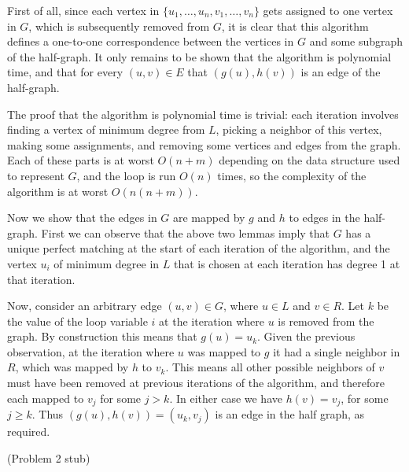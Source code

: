 \documentclass{hmcpset}
\begin{document}
\begin{solution}
\begin{enumerate}
First of all, since each vertex in $\{u_1,\ldots,u_n,v_1,\ldots,v_n\}$
gets assigned to one vertex in $G$, which is subsequently removed
from $G$, it is clear that this algorithm defines a one-to-one correspondence
between the vertices in $G$ and some subgraph of the half-graph.
It only remains to be shown that the algorithm is polynomial time, and that
for every $(u, v) \in E$ that $(g(u), h(v))$ is an edge of the half-graph.

The proof that the algorithm is polynomial time is trivial: each iteration
involves finding a vertex of minimum degree from $L$, picking a neighbor
of this vertex, making some assignments, and removing some vertices and
edges from the graph. Each of these parts is at worst $O(n + m)$ depending on
the data structure used to represent $G$, and the loop is run $O(n)$ times,
so the complexity of the algorithm is at worst $O(n(n + m))$.

Now we show that the edges in $G$ are mapped by $g$ and $h$ to edges
in the half-graph. First we can observe that the above two
lemmas imply that $G$ has a unique perfect matching at the start of each
iteration of the algorithm, and the vertex $u_i$ of minimum degree in $L$
that is chosen at each iteration has degree 1 at that iteration.

Now, consider an arbitrary edge $(u, v) \in G$, where $u \in L$ and
$v \in R$. Let $k$ be the value of the loop variable $i$ at the iteration
where $u$ is removed from the graph. By construction this means that
$g(u) = u_k$. Given the previous observation, at the iteration where
$u$ was mapped to $g$ it had a single neighbor in $R$, which was mapped
by $h$ to $v_k$. This means all other possible neighbors of $v$ must have
been removed at previous iterations of the algorithm, and therefore each
mapped to $v_j$ for some $j > k$. In either case we have $h(v) = v_j$,
for some $j \ge k$. Thus $(g(u), h(v)) = (u_k, v_j)$ is an edge
in the half graph, as required.



\end{enumerate}
\end{solution}
\begin{problem}[2]
(Problem 2 stub)
\end{problem}
\end{document}
